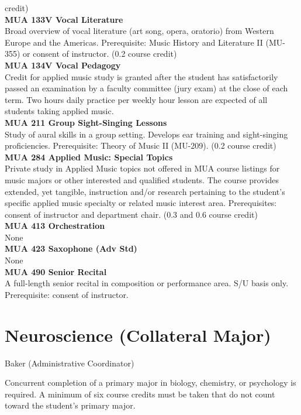 \documentclass[
  letterpaper,
]{scrbook}
\begin{document}
credit)\\
\textbf{MUA 133V Vocal Literature}\\
Broad overview of vocal literature (art song, opera, oratorio) from
Western Europe and the Americas. Prerequisite: Music History and
Literature II (MU-355) or consent of instructor. (0.2 course credit)\\
\textbf{MUA 134V Vocal Pedagogy}\\
Credit for applied music study is granted after the student has
satisfactorily passed an examination by a faculty committee (jury exam)
at the close of each term. Two hours daily practice per weekly hour
lesson are expected of all students taking applied music.\\
\textbf{MUA 211 Group Sight-Singing Lessons}\\
Study of aural skills in a group setting. Develops ear training and
sight-singing proficiencies. Prerequisite: Theory of Music II (MU-209).
(0.2 course credit)\\
\textbf{MUA 284 Applied Music: Special Topics}\\
Private study in Applied Music topics not offered in MUA course listings
for music majors or other interested and qualified students. The course
provides extended, yet tangible, instruction and/or research pertaining
to the student's specific applied music specialty or related music
interest area. Prerequisites: consent of instructor and department
chair. (0.3 and 0.6 course credit)\\
\textbf{MUA 413 Orchestration}\\
None\\
\textbf{MUA 423 Saxophone (Adv Std)}\\
None\\
\textbf{MUA 490 Senior Recital}\\
A full-length senior recital in composition or performance area. S/U
basis only. Prerequisite: consent of instructor.

\section{Neuroscience (Collateral Major)}\label{sec-neuroscience}

Baker (Administrative Coordinator)

Concurrent completion of a primary major in biology, chemistry, or
psychology is required. A minimum of six course credits must be taken
that do not count toward the student's primary major.
\end{document}
